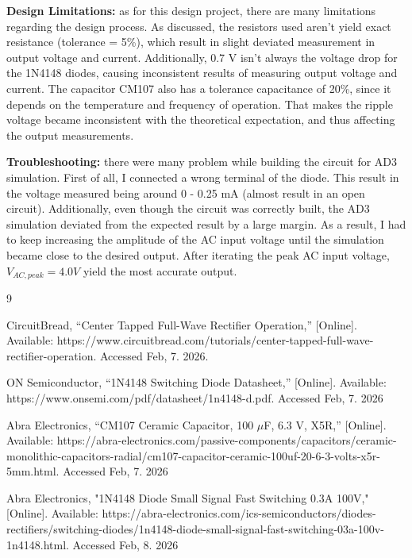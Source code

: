 \documentclass[12pt]{article}
\begin{document}
    \textbf{Design Limitations:} as for this design project, there are many limitations regarding the design process. As discussed, the resistors used aren't yield exact resistance (tolerance = 5\%), which result in slight deviated measurement in output voltage and current. Additionally, 0.7 V isn't always the voltage drop for the 1N4148 diodes, causing inconsistent results of measuring output voltage and current. The capacitor CM107 also has a tolerance capacitance of 20\%, since it depends on the temperature and frequency of operation. That makes the ripple voltage became inconsistent with the theoretical expectation, and thus affecting the output measurements. 


    \textbf{Troubleshooting:} there were many problem while building the circuit for AD3 simulation. First of all, I connected a wrong terminal of the diode. This result in the voltage measured being around 0 - 0.25 mA (almost result in an open circuit). Additionally, even though the circuit was correctly built, the AD3 simulation deviated from the expected result by a large margin. As a result, I had to keep increasing the amplitude of the AC input voltage until the simulation became close to the desired output. After iterating the peak AC input voltage, \(V_{AC,peak}=4.0V\) yield the most accurate output.  

    \newpage
    \begin{thebibliography}{9}

        CircuitBread, ``Center Tapped Full-Wave Rectifier Operation,'' 
        [Online]. Available: https://www.circuitbread.com/tutorials/center-tapped-full-wave-rectifier-operation. Accessed Feb, 7. 2026.

        ON Semiconductor, ``1N4148 Switching Diode Datasheet,'' 
        [Online]. Available: https://www.onsemi.com/pdf/datasheet/1n4148-d.pdf. Accessed Feb, 7. 2026

    Abra Electronics, ``CM107 Ceramic Capacitor, 100 $\mu$F, 6.3 V, X5R,'' 
    [Online]. Available: https://abra-electronics.com/passive-components/capacitors/ceramic-monolithic-capacitors-radial/cm107-capacitor-ceramic-100uf-20-6-3-volts-x5r-5mm.html. Accessed Feb, 7. 2026

    Abra Electronics, "1N4148 Diode Small Signal Fast Switching 0.3A 100V," [Online]. Available: https://abra-electronics.com/ics-semiconductors/diodes-rectifiers/switching-diodes/1n4148-diode-small-signal-fast-switching-03a-100v-1n4148.html. Accessed Feb, 8. 2026
    \end{thebibliography} 
\end{document}
